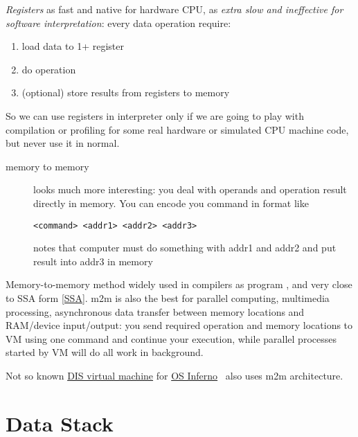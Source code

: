 \bigskip
\emph{Registers} as fast and native for hardware CPU, as \emph{extra slow and
ineffective for software interpretation}: every data operation require:
\begin{enumerate}[nosep]
\item load data to 1+ register
\item do operation
\item (optional) store results from registers to memory 
\end{enumerate}

\bigskip
So we can use registers in interpreter only if we are going to play with
compilation or profiling for some real hardware or simulated CPU machine code,
but never use it in normal.

\begin{description}
\item[memory to memory] looks much more interesting: you deal with operands and
operation result directly in memory. You can encode you command in format like
\begin{lstlisting}
<command> <addr1> <addr2> <addr3> 
\end{lstlisting}
notes that computer must do something with addr1 and addr2 and put result into
addr3 in memory
\end{description}

Memory-to-memory method widely used in compilers as program  \cite{dragon}, and very close to SSA form \ref{SSA}. m2m is also
the best for parallel computing, multimedia processing, asynchronous data transfer between memory locations and
RAM/device input/output: you send required operation and memory locations to VM using one
command and continue your execution, while parallel processes started by VM will
do all work in background.

Not so known \href{http://www.vitanuova.com/inferno/papers/dis.html}{DIS virtual
machine} for \href{http://www.vitanuova.com/inferno/}{OS Inferno}\  also uses m2m architecture. 

\section{Data Stack}

